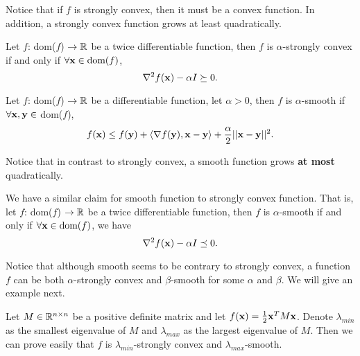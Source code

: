 \documentclass[../main.tex]{subfiles}
\begin{document}
Notice that if $f$ is strongly convex, then it must be a convex function. In addition, a strongly convex function grows at least quadratically. 

\begin{claim}\label{strongly-convex-lemma}
	Let $f$: dom($f$) $\to \mathbb{R}$ be a twice differentiable function, then $f$ is $\alpha$-strongly convex if and only if  $\forall \mathbf{x} \in \textmd{dom}(f)$,
		\begin{equation*}
			\nabla^2 f(\mathbf{x}) - \alpha I \succeq 0.
		\end{equation*}
\end{claim}

\begin{definition}
	Let $f$: dom($f$) $\to \mathbb{R}$ be a differentiable function, let $\alpha >0$, then $f$ is $\alpha$-smooth if $\forall \mathbf{x}, \mathbf{y} \in $ dom($f$), 
	\begin{equation*}
		f(\mathbf{x}) \leq f(\mathbf{y}) + \langle \nabla f(\mathbf{y}), \mathbf{x} - \mathbf{y} \rangle + \frac{\alpha}{2} ||\mathbf{x} - \mathbf{y}||^2.
	\end{equation*}
\end{definition}

Notice that in contrast to strongly convex, a smooth function grows \textbf{at most} quadratically.

\begin{claim}\label{smooth-lemma}
	We have a similar claim for smooth function to strongly convex function. That is, let $f$: dom($f$) $\to \mathbb{R}$ be a twice differentiable function, then $f$ is $\alpha$-smooth if and only if $\forall \mathbf{x} \in \textmd{dom}(f)$, we have
	\begin{equation*}
		\nabla^2 f(\mathbf{x}) - \alpha I \preceq 0.
	\end{equation*}
\end{claim}

Notice that although smooth seems to be contrary to strongly convex, a function $f$ can be both $\alpha$-strongly convex and $\beta$-smooth for some $\alpha$ and $\beta$. We will give an example next.

\begin{example}
	Let $M \in \mathbb{R}^{n\times n}$ be a positive definite matrix and let $f(\mathbf{x}) = \frac{1}{2} \mathbf{x}^T M \mathbf{x}$. Denote $\lambda_{min}$ as the smallest eigenvalue of $M$ and $\lambda_{max}$ as the largest eigenvalue of $M$. Then we can prove easily that $f$ is $\lambda_{min}$-strongly convex and $\lambda_{max}$-smooth.
\end{example}
\end{document}
